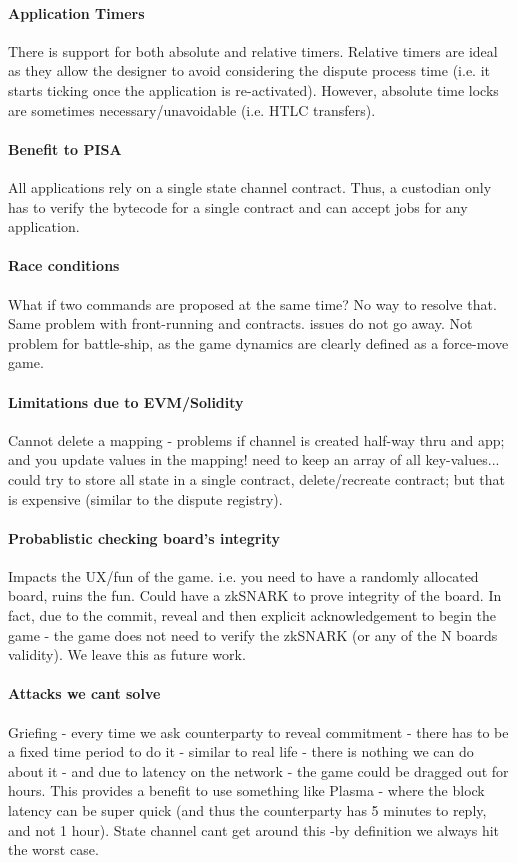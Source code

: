 \documentclass{llncs}
\begin{document}
\paragraph{Application Timers} There is support for both absolute and relative timers. Relative timers are ideal as they allow the designer to avoid considering the dispute process time (i.e. it starts ticking once the application is re-activated). However, absolute time locks are sometimes necessary/unavoidable (i.e. HTLC transfers). 

\paragraph{Benefit to PISA} All applications rely on a single state channel contract. Thus, a custodian only has to verify the bytecode for a single contract and can accept jobs for any application. 

\paragraph{Race conditions} What if two commands are proposed at the same time? No way to resolve that. Same problem with front-running and contracts. issues do not go away. Not problem for battle-ship, as the game dynamics are clearly defined as a force-move game. 

\paragraph{Limitations due to EVM/Solidity} Cannot delete a mapping - problems if channel is created half-way thru and app; and you update values in the mapping! need to keep an array of all key-values... could try to store all state in a single contract, delete/recreate contract; but that is expensive (similar to the dispute registry).  

\paragraph{Probablistic checking board's integrity} Impacts the UX/fun of the game. i.e. you need to have a randomly allocated board, ruins the fun. Could have a zkSNARK to prove integrity of the board. In fact, due to the commit, reveal and then explicit acknowledgement to begin the game - the game does not need to verify the zkSNARK (or any of the N boards validity). We leave this as future work.  

\paragraph{Attacks we cant solve} Griefing - every time we ask counterparty to reveal commitment - there has to be a fixed time period to do it - similar to real life - there is nothing we can do about it - and due to latency on the network - the game could be dragged out for hours. This provides a benefit to use something like Plasma - where the block latency can be super quick (and thus the counterparty has 5 minutes to reply, and not 1 hour). State channel cant get around this -by definition we always hit the worst case. 
\end{document}
